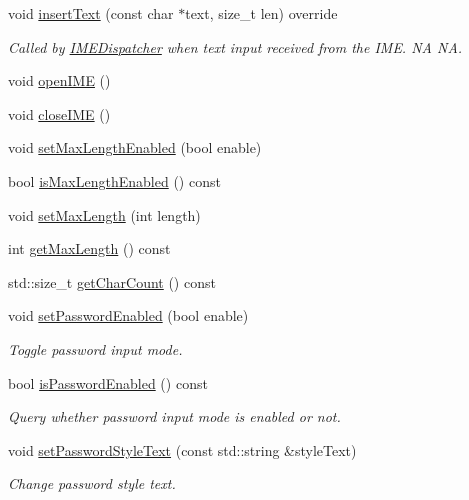 \begin{DoxyCompactItemize}
\mbox{\label{classui_1_1UICCTextField_ac55d7a518d395742fe01ff21f000feb5}} 
void \hyperlink{classui_1_1UICCTextField_ac55d7a518d395742fe01ff21f000feb5}{insert\+Text} (const char $\ast$text, size\+\_\+t len) override
\begin{DoxyCompactList}\small\item\em Called by \hyperlink{classIMEDispatcher}{I\+M\+E\+Dispatcher} when text input received from the I\+ME.  NA  NA. \end{DoxyCompactList}\item 
void \hyperlink{classui_1_1UICCTextField_a4f7601ce915caa7512271cd991661301}{open\+I\+ME} ()
\item 
void \hyperlink{classui_1_1UICCTextField_a5091bd4b413b62335232752f4d6e6c89}{close\+I\+ME} ()
\item 
void \hyperlink{classui_1_1UICCTextField_a195a8a8163331112e9ce7e7e60d02d81}{set\+Max\+Length\+Enabled} (bool enable)
\item 
bool \hyperlink{classui_1_1UICCTextField_a80855457b243d58c55f19f9ca3933758}{is\+Max\+Length\+Enabled} () const
\item 
void \hyperlink{classui_1_1UICCTextField_a34d3813016eefd391606ed1aa0b7f0b5}{set\+Max\+Length} (int length)
\item 
int \hyperlink{classui_1_1UICCTextField_a7603841f39081a4c538a71096904975c}{get\+Max\+Length} () const
\item 
std\+::size\+\_\+t \hyperlink{classui_1_1UICCTextField_a2f8ba9d180b639dc4e4b77e1e052aecb}{get\+Char\+Count} () const
\item 
void \hyperlink{classui_1_1UICCTextField_a8cec7c2ce0befc7c7f9f9e5d8bdae59a}{set\+Password\+Enabled} (bool enable)
\begin{DoxyCompactList}\small\item\em Toggle password input mode. \end{DoxyCompactList}\item 
bool \hyperlink{classui_1_1UICCTextField_a993531ac778c06a81f91cd465edd72ef}{is\+Password\+Enabled} () const
\begin{DoxyCompactList}\small\item\em Query whether password input mode is enabled or not. \end{DoxyCompactList}\item 
void \hyperlink{classui_1_1UICCTextField_a3fe6bde05e9a4b16abaf0eddf79f2ed6}{set\+Password\+Style\+Text} (const std\+::string \&style\+Text)
\begin{DoxyCompactList}\small\item\em Change password style text. \end{DoxyCompactList}\item 

\end{DoxyCompactItemize}
